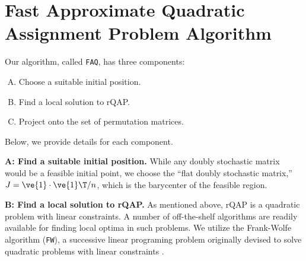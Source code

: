 \documentclass[11pt]{article}
\begin{document}





\section{Fast Approximate Quadratic Assignment Problem Algorithm} %
\label{sec:FAQ}


Our algorithm, called \texttt{FAQ}, has three components:
\begin{enumerate}[A.]
	\item Choose a suitable initial position. %
	\item Find a local solution to rQAP. %
	\item Project onto the set of permutation matrices. %
\end{enumerate}
Below, we provide details for each component.

\textbf{A: Find a suitable initial position.}  While any doubly stochastic matrix would be a feasible initial point, we choose the 
``flat doubly  stochastic matrix,'' $J=\ve{1} \cdot \ve{1}\T/n$, which is the barycenter of the feasible region.


\textbf{B: Find a local solution to rQAP.} As mentioned above, rQAP is a quadratic problem with linear constraints.  A number of off-the-shelf algorithms are readily available for finding local optima in such problems.  We utilize the Frank-Wolfe algorithm (\texttt{FW}), a successive linear programing problem originally devised to solve quadratic problems with linear constraints \cite{Frank1956, Bradley1977}.
\end{document}
